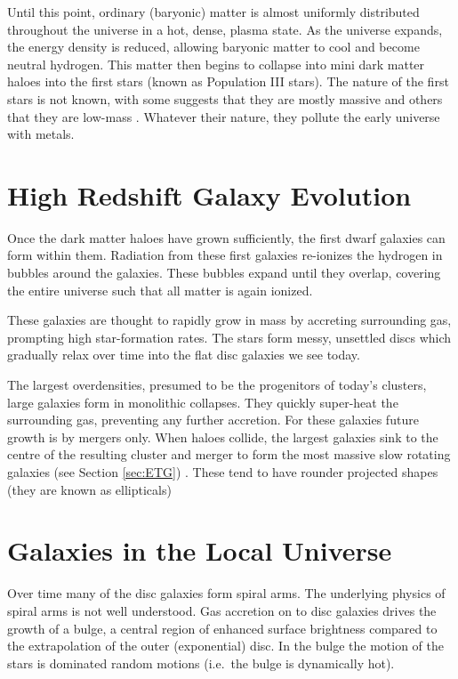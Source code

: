 	Until this point, ordinary (baryonic) matter is almost uniformly distributed throughout the universe in a hot, dense, plasma state. As the universe expands, the energy density is reduced, allowing baryonic matter to cool and become neutral hydrogen. This matter then begins to collapse into mini dark matter haloes into the first stars (known as Population III stars). The nature of the first stars is not known, with some suggests that they are mostly massive \citep[e.g.][and the references therein]{Bromm2011} and others that they are low-mass \citep[e.g.][]{Stacy2014}. Whatever their nature, they pollute the early universe with metals. 

\section{High Redshift Galaxy Evolution}
	Once the dark matter haloes have grown sufficiently, the first dwarf galaxies can form within them. Radiation from these first galaxies re-ionizes the hydrogen in bubbles around the galaxies. These bubbles expand until they overlap, covering the entire universe such that all matter is again ionized. 

	These galaxies are thought to rapidly grow in mass by accreting surrounding gas, prompting high star-formation rates. The stars form messy, unsettled discs which gradually relax over time into the flat disc galaxies we see today.

	The largest overdensities, presumed to be the progenitors of today's clusters, large galaxies form in monolithic collapses. They quickly super-heat the surrounding gas, preventing any further accretion. For these galaxies future growth is by mergers only. When haloes collide, the largest galaxies sink to the centre of the resulting cluster and merger to form the most massive slow rotating galaxies (see Section \ref{sec:ETG}) \citep[e.g.][fig.30]{Cappellari2016}. These tend to have rounder projected shapes (they are known as ellipticals)

\section{Galaxies in the Local Universe}
	Over time many of the disc galaxies form spiral arms. The underlying physics of spiral arms is not well understood. Gas accretion on to disc galaxies drives the growth of a bulge, a central region of enhanced surface brightness compared to the extrapolation of the outer (exponential) disc. In the bulge the motion of the stars is dominated random motions (i.e.\ the bulge is dynamically hot). 

